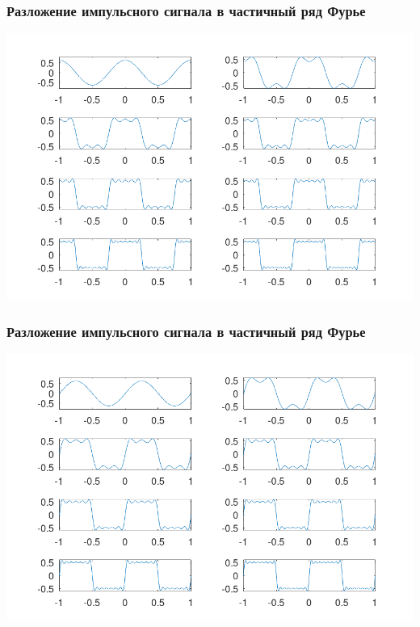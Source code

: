 \begin{frame}
\frametitle{Разложение импульсного сигнала в частичный ряд Фурье}
    \includegraphics[width=\textwidth]{../octave/plot-meandr-cos.png}
\end{frame}

\begin{frame}
\frametitle{Разложение импульсного сигнала в частичный ряд Фурье}
    \includegraphics[width=\textwidth]{../octave/plot-meandr-sin.png}
\end{frame}

